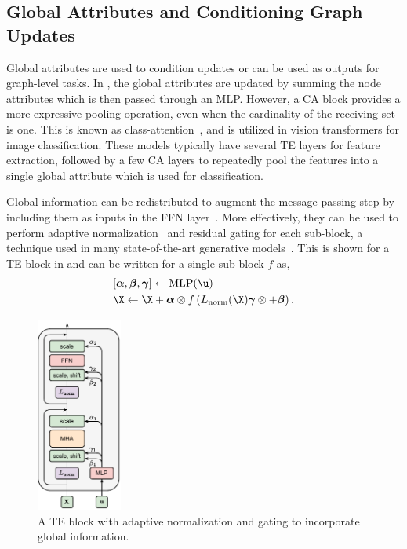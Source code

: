 \subsection{Global Attributes and Conditioning Graph Updates}
\label{sec:global_attributes}

Global attributes are used to condition updates or can be used as outputs for graph-level tasks.
In , the global attributes are updated by summing the node attributes which is then passed through an MLP\@.
However, a CA block provides a more expressive pooling operation, even when the cardinality of the receiving set is one.
This is known as class-attention~\cite{GoingDeeper}, and is utilized in vision transformers for image classification.
These models typically have several TE layers for feature extraction, followed by a few CA layers to repeatedly pool the features into a single global attribute which is used for classification.

Global information can be redistributed to augment the message passing step by including them as inputs in the FFN layer~\cite{PCJeDiDiffusionParticle}.
More effectively, they can be used to perform adaptive normalization~\cite{FiLMVisualReasoning} and residual gating for each sub-block, a technique used in many state-of-the-art generative models~\cite{SD3, DIT, flux2024github}.
This is shown for a TE block in  and can be written for a single sub-block $f$ as,
\begin{equation}
    \begin{aligned}
    & [\boldsymbol{\alpha}, \boldsymbol{\beta}, \boldsymbol{\gamma}] \leftarrow \text{MLP}(\u) \\
    & \X \leftarrow \X + \boldsymbol{\alpha} \otimes f \left(L_\text{norm}(\X)\boldsymbol{\gamma} \otimes  + \boldsymbol{\beta}\right).
    \end{aligned}
\end{equation}

\begin{figure}
    \centering
    \includegraphics[width=0.25\textwidth]{Figures/graph_networks/adaptivegating.pdf}
    \caption{A TE block with adaptive normalization and gating to incorporate global information.}
    \label{fig:adaptive_gating}
\end{figure}
